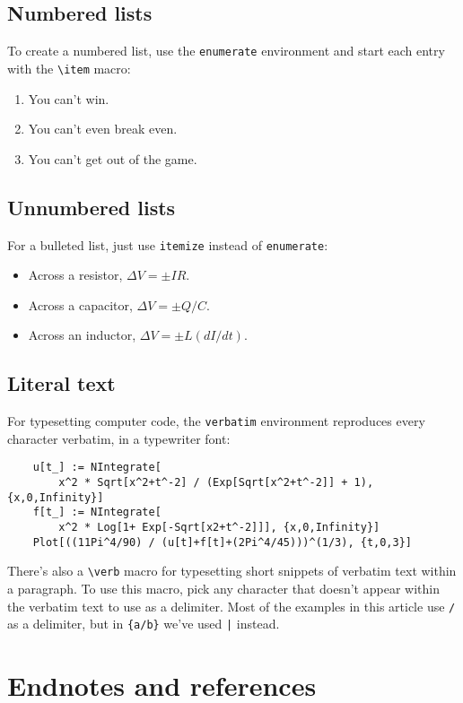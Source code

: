 \documentclass[prb,preprint]{revtex4-1}
\begin{document}
\subsection{Numbered lists}

To create a numbered list, use the \texttt{enumerate} environment and start
each entry with the \verb/\item/ macro:
\begin{enumerate}
\item You can't win.
\item You can't even break even.
\item You can't get out of the game.
\end{enumerate}

\subsection{Unnumbered lists}

For a bulleted list, just use \texttt{itemize} instead of \texttt{enumerate}:
\begin{itemize}
\item Across a resistor, $\Delta V = \pm IR$.
\item Across a capacitor, $\Delta V = \pm Q/C$.
\item Across an inductor, $\Delta V = \pm L(dI/dt)$.
\end{itemize}

\subsection{Literal text}

For typesetting computer code, the \texttt{verbatim} environment reproduces
every character verbatim, in a typewriter font:
\begin{verbatim}
    u[t_] := NIntegrate[
        x^2 * Sqrt[x^2+t^-2] / (Exp[Sqrt[x^2+t^-2]] + 1), {x,0,Infinity}]
    f[t_] := NIntegrate[
        x^2 * Log[1+ Exp[-Sqrt[x2+t^-2]]], {x,0,Infinity}]
    Plot[((11Pi^4/90) / (u[t]+f[t]+(2Pi^4/45)))^(1/3), {t,0,3}]
\end{verbatim}
There's also a \verb/\verb/ macro for typesetting short snippets of verbatim
text within a paragraph. To use this macro, pick any character that doesn't
appear within the verbatim text to use as a delimiter. Most of the examples
in this article use \texttt{/} as a delimiter, but in \verb|{a/b}| we've used
\verb/|/ instead.


\section{Endnotes and references}
\end{document}
